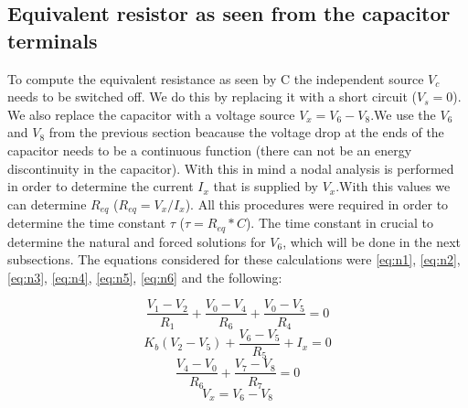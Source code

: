 \subsection{Equivalent resistor as seen from the capacitor terminals}

To compute the equivalent resistance as seen by C the independent source $V_c$ needs to be switched off. We do this by replacing it with a short circuit ($V_s=0$). We also replace the capacitor with a voltage source $V_x=V_6-V_8$.We use the $V_6$ and $V_8$ from the previous section beacause the voltage drop at the ends of the capacitor needs to be a continuous function (there can not be an energy discontinuity in the capacitor). With this in mind a nodal analysis is performed in order to determine the current $I_x$ that is supplied by $V_x$.With this values we can determine $R_{eq}$ ($R_{eq}=V_x/I_x$). All this procedures were required in order to determine the time constant $\tau$ ($\tau=R_{eq}*C$). The time constant in crucial to determine the natural and forced solutions for $V_6$, which will be done in the next subsections. The equations considered for these calculations were \ref{eq:n1}, \ref{eq:n2}, \ref{eq:n3}, \ref{eq:n4}, \ref{eq:n5}, \ref{eq:n6} and the following:


\begin {equation}
	\frac{V_1-V_2}{R_1} + \frac{V_0-V_4}{R_6} + \frac{V_0-V_5}{R_4} = 0
	\label{eq:eq7}
\end{equation}
\begin {equation}
	K_b(V_2-V_5) + \frac{V_6-V_5}{R_5} + I_x  = 0
	\label{eq:eq8}
\end{equation}
\begin {equation}
	\frac{V_4-V_0}{R_6} + \frac{V_7 - V_8}{R_7} = 0
	\label{eq:eq9}
\end{equation}
\begin {equation}
	V_x = V_6 - V_8
	\label{eq:eq10}
\end{equation}



